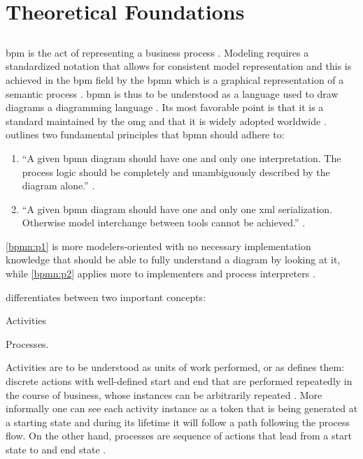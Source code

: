 \chapter{Theoretical Foundations}
\label{ch:foundations}

\section{}
\label{sec:bpmn}

\gls{bpm} is the act of representing a business process \citep{Silver2011}. Modeling requires a standardized notation that allows for consistent model representation and this is achieved in the \gls{bpm} field by the \gls{bpmn} which is a graphical representation of a semantic process \citep{Silver2011}. \gls{bpmn} is thus to be understood as a language used to draw diagrams \ie a diagramming language \citep{Silver2011}. Its most favorable point is that it is a standard maintained by the \gls{omg} and that it is widely adopted worldwide \citep{Silver2011}. \citet{Silver2011} outlines two fundamental principles that \gls{bpmn} should adhere to:

\begin{enumerate}[label=\textbf{P. \Roman*},ref=Principle \Roman*]
 	\item ``A given \gls{bpmn} diagram should have one and only one interpretation. The process logic should be completely and unambiguously described by the diagram alone.'' \citep[p. v]{Silver2011}. \label{bpmn:p1}
 	\item ``A given \gls{bpmn} diagram should have one and only one \gls{xml} serialization. Otherwise model interchange between tools cannot be achieved.'' \citep[p. v]{Silver2011}. \label{bpmn:p2}
\end{enumerate} 

\ref{bpmn:p1} is more modelers-oriented with no necessary implementation knowledge that should be able to fully understand a diagram by looking at it, while \ref{bpmn:p2} applies more to implementers and process interpreters \citep{Silver2011}.

\citet{Silver2011} differentiates between two important concepts:
\begin{enumerate*}
	\item Activities
	\item Processes.
\end{enumerate*}

Activities are to be understood as units of work performed, or as \citet{Silver2011} defines them: discrete actions with well-defined start and end that are performed repeatedly in the course of business, whose instances can be arbitrarily repeated \citep[p. 10]{Silver2011}. More informally one can see each activity instance as a token that is being generated at a starting state and during its lifetime it will follow a path following the process flow. On the other hand, processes are sequence of actions that lead from a start state to and end state \citep[p. 11]{Silver2011}.

